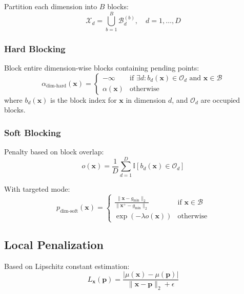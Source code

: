 \documentclass[11pt,a4paper]{article}
\begin{document}
Partition each dimension into $B$ blocks:
\begin{equation}
    \mathcal{X}_d = \bigcup_{b=1}^B \mathcal{B}_d^{(b)}, \quad d = 1, \ldots, D
\end{equation}

\subsubsection{Hard Blocking}

Block entire dimension-wise blocks containing pending points:
\begin{equation}
    \alpha_{\text{dim-hard}}(\mathbf{x}) = 
    \begin{cases}
        -\infty & \text{if } \exists d : b_d(\mathbf{x}) \in \mathcal{O}_d \text{ and } \mathbf{x} \in \mathcal{B} \\
        \alpha(\mathbf{x}) & \text{otherwise}
    \end{cases}
\end{equation}
where $b_d(\mathbf{x})$ is the block index for $\mathbf{x}$ in dimension $d$, and $\mathcal{O}_d$ are occupied blocks.

\subsubsection{Soft Blocking}

Penalty based on block overlap:
\begin{equation}
    o(\mathbf{x}) = \frac{1}{D} \sum_{d=1}^D \mathbb{I}[b_d(\mathbf{x}) \in \mathcal{O}_d]
\end{equation}

With targeted mode:
\begin{equation}
    p_{\text{dim-soft}}(\mathbf{x}) = 
    \begin{cases}
        \frac{\|\mathbf{x} - g_{\min}\|_2}{\|\mathbf{x}^+ - g_{\min}\|_2} & \text{if } \mathbf{x} \in \mathcal{B} \\
        \exp(-\lambda o(\mathbf{x})) & \text{otherwise}
    \end{cases}
\end{equation}

\subsection{Local Penalization}

Based on Lipschitz constant estimation:
\begin{equation}
    L_{\mathbf{x}}(\mathbf{p}) = \frac{|\mu(\mathbf{x}) - \mu(\mathbf{p})|}{\|\mathbf{x} - \mathbf{p}\|_2 + \epsilon}
\end{equation}
\end{document}
